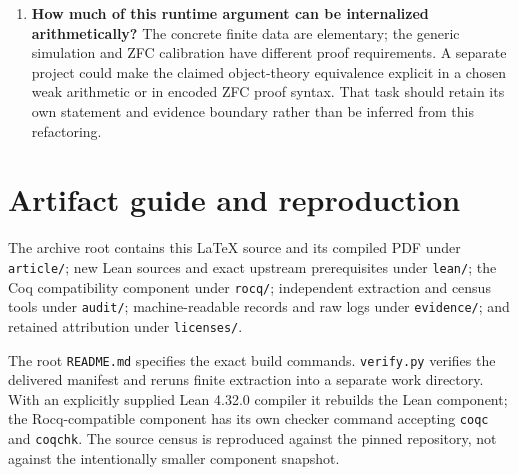 \documentclass[11pt]{article}
\theoremstyle{definition}\newtheorem{definition}[theorem]{Definition}
\theoremstyle{remark}\newtheorem{remark}[theorem]{Remark}
\newcommand{\code}[1]{\nolinkurl{#1}}
\begin{document}
\begin{enumerate}
\item \textbf{How much of this runtime argument can be internalized arithmetically?} The concrete finite data are elementary; the generic simulation and ZFC calibration have different proof requirements. A separate project could make the claimed object-theory equivalence explicit in a chosen weak arithmetic or in encoded ZFC proof syntax. That task should retain its own statement and evidence boundary rather than be inferred from this refactoring.
\end{enumerate}

\section{Artifact guide and reproduction}

The archive root contains this LaTeX source and its compiled PDF under \code{article/}; new Lean sources and exact upstream prerequisites under \code{lean/}; the Coq compatibility component under \code{rocq/}; independent extraction and census tools under \code{audit/}; machine-readable records and raw logs under \code{evidence/}; and retained attribution under \code{licenses/}.

The root \code{README.md} specifies the exact build commands. \code{verify.py} verifies the delivered manifest and reruns finite extraction into a separate work directory. With an explicitly supplied Lean 4.32.0 compiler it rebuilds the Lean component; the Rocq-compatible component has its own checker command accepting \code{coqc} and \code{coqchk}. The source census is reproduced against the pinned repository, not against the intentionally smaller component snapshot.
\end{document}
